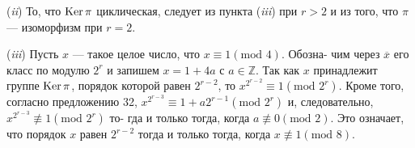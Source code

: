 \documentclass{../template/mai_book}
\begin{document}
\begin{myproof}
\par  (\textit{ii}) То, что $\operatorname{Ker}{\pi}$ циклическая, следует из пункта (\textit{iii}) при $r > 2$\linebreak
и из того, что $\pi$ --- изоморфизм при $r = 2$.
\par  (\textit{iii}) Пусть $x$ — такое целое число, что $x \equiv 1 (\text{mod } 4)$. Обозна­-\linebreak
чим через $\overline{x}$ его класс по модулю $2^r$ и запишем $x = 1 + 4a$ с
$a \in \mathbb{Z}$. Так как $x$ принадлежит группе $\operatorname{Ker}{\pi}$, порядок которой равен\linebreak
$2^{r-2}$, то $x^{2^{r-2}} \equiv 1 (\text{mod } 2^r)$. Кроме того, согласно предложению 32,\linebreak
$x^{2^{r-3}} \equiv 1 + a2^{r-1} (\text{mod } 2^r)$ и, следовательно, $x^{2^{r-3}} \not\equiv 1 (\text{mod } 2^r)$ то­-\linebreak
гда и только тогда, когда $a \not\equiv 0 (\text{mod } 2)$. Это означает, что порядок\linebreak
$x$ равен $2^{r-2}$ тогда и только тогда, когда $x \not\equiv 1 (\text{mod }8)$.
\end{myproof}
\end{document}
